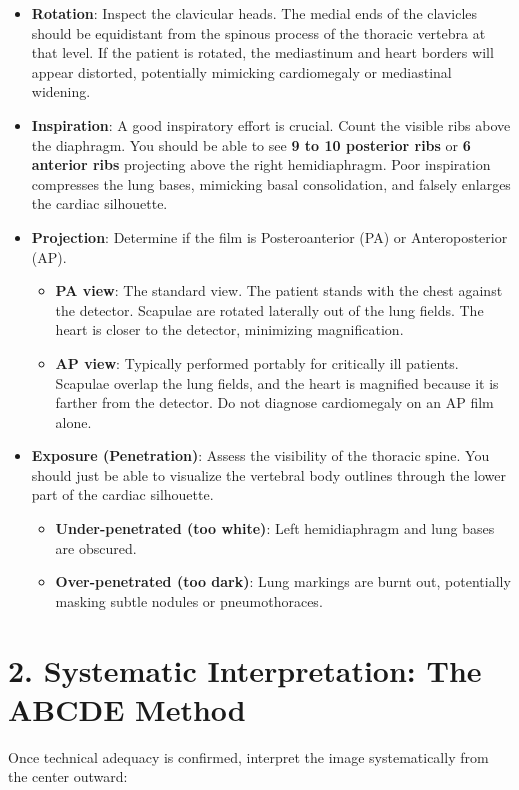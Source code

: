 \begin{itemize}
    \item \textbf{Rotation}: Inspect the clavicular heads. The medial ends of the clavicles should be equidistant from the spinous process of the thoracic vertebra at that level. If the patient is rotated, the mediastinum and heart borders will appear distorted, potentially mimicking cardiomegaly or mediastinal widening.
    \item \textbf{Inspiration}: A good inspiratory effort is crucial. Count the visible ribs above the diaphragm. You should be able to see \textbf{9 to 10 posterior ribs} or \textbf{6 anterior ribs} projecting above the right hemidiaphragm. Poor inspiration compresses the lung bases, mimicking basal consolidation, and falsely enlarges the cardiac silhouette.
    \item \textbf{Projection}: Determine if the film is Posteroanterior (PA) or Anteroposterior (AP).
    \begin{itemize}
        \item \textbf{PA view}: The standard view. The patient stands with the chest against the detector. Scapulae are rotated laterally out of the lung fields. The heart is closer to the detector, minimizing magnification.
        \item \textbf{AP view}: Typically performed portably for critically ill patients. Scapulae overlap the lung fields, and the heart is magnified because it is farther from the detector. Do not diagnose cardiomegaly on an AP film alone.
    \end{itemize}
    \item \textbf{Exposure (Penetration)}: Assess the visibility of the thoracic spine. You should just be able to visualize the vertebral body outlines through the lower part of the cardiac silhouette. 
    \begin{itemize}
        \item \textbf{Under-penetrated (too white)}: Left hemidiaphragm and lung bases are obscured.
        \item \textbf{Over-penetrated (too dark)}: Lung markings are burnt out, potentially masking subtle nodules or pneumothoraces.
    \end{itemize}
\end{itemize}


\section*{2. Systematic Interpretation: The ABCDE Method}
Once technical adequacy is confirmed, interpret the image systematically from the center outward:

